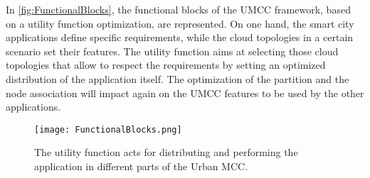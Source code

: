\documentclass[twoside,openright]{report}
\begin{document}
In \autoref{fig:FunctionalBlocks}, the functional blocks of the \gls{UMCC} framework, based on a utility function optimization, are represented. 
On one hand, the smart city applications define specific requirements, while the cloud topologies in a certain scenario set their features. 
The utility function aims at selecting those cloud topologies that allow to respect the requirements by setting an optimized distribution of the application itself. 
The optimization of the partition and the node association will impact again on the \gls{UMCC} features to be used by the other applications.

\begin{figure}[tbp]
\centering
\texttt{[image: FunctionalBlocks.png]}
\caption{The utility function acts for distributing and performing the application in different parts of the Urban MCC.}
\label{fig:FunctionalBlocks}
\end{figure}
\end{document}
